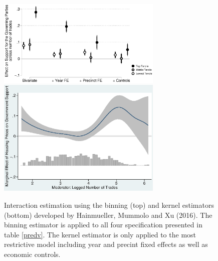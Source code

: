 \documentclass[12pt,a4paper]{article}
\begin{document}
			
			\begin{figure}
				\includegraphics[width=0.7\textwidth]{../figures/localactivity_sup.eps}
				\includegraphics[width=0.7\textwidth]{../figures/localactivity_sup2.eps}
				
				\caption{Interaction estimation using the binning (top) and kernel estimators (bottom) developed by Hainmueller, Mummolo and Xu (2016). The binning estimator is applied to all four specification presented in table \ref{predv}. The kernel estimator is only applied to the most restrictive model including year and precint fixed effects as well as economic controls.}
				\label{terciles}
			\end{figure}
			
			
			
			
			
		
\end{document}
